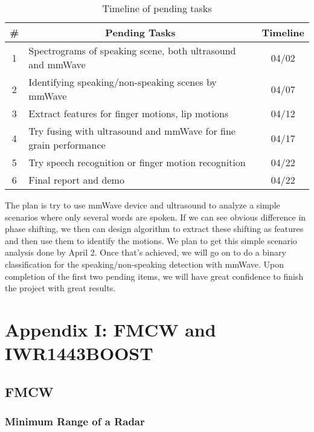 \documentclass[11pt, oneside]{article}   	%
\begin{document}
\begin{table}[ht]
\centering 
\caption{Timeline of pending tasks}
\label{tab:pending}
\vspace{4pt}
\begin{tabular}{|c|l|c|}
\hline
\# &  \multicolumn{1}{|c|}{Pending Tasks} & Timeline  \\
\hline
\hline
1 & Spectrograms of speaking scene, both ultrasound and mmWave& 04/02\\
\hline
2 &  Identifying speaking/non-speaking scenes by mmWave & 04/07\\
\hline
3 & Extract features for finger motions, lip motions & 04/12\\
\hline
4 &  Try fusing with ultrasound and mmWave for fine grain performance & 04/17 \\
\hline
5 &  Try speech recognition or finger motion recognition& 04/22   \\
\hline
6 & Final report and demo & 04/22 \\
\hline
\end{tabular}
\end{table}

The plan is try to use mmWave device and ultrasound to analyze a simple scenarios where only several words are spoken. If we can see obvious difference in phase shifting, we then can design algorithm to extract these shifting as features and then use them to identify the motions. We plan to get this simple scenario analysis done by April 2. Once that's achieved, we will go on to do a binary classification for the speaking/non-speaking detection with mmWave. Upon completion of the first two pending items, we will have great confidence to finish the project with great results.


\newpage
\section{Appendix I: FMCW and IWR1443BOOST}
\label{sec:app:fmcw}
\subsection{FMCW}
\subsubsection{Minimum Range of a Radar}
\end{document}
